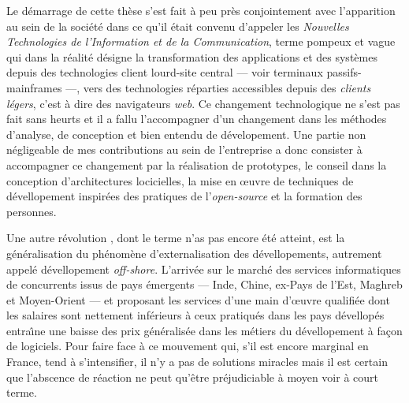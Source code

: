 Le d\'emarrage de cette th\`ese s'est fait \`a peu pr\`es
conjointement avec l'apparition  au sein de la soci\'et\'e dans ce qu'il
\'etait convenu d'appeler les \emph{Nouvelles Technologies de l'Information
et de la Communication}, terme pompeux et vague qui dans la
r\'ealit\'e d\'esigne la transformation des applications et des
syst\`emes depuis des technologies client lourd-site central --- voir
terminaux passifs-mainframes ---, vers des technologies r\'eparties
accessibles depuis des \emph{clients l\'egers}, c'est \`a dire des
navigateurs \emph{web}. Ce changement technologique ne s'est pas fait
sans heurts et il a fallu l'accompagner d'un changement dans les
m\'ethodes d'analyse, de conception et bien entendu de
d\'evelopement. Une partie non n\'egligeable de mes contributions au
sein de l'entreprise a donc consister \`a accompagner ce changement
par la r\'ealisation de prototypes, le conseil dans la conception
d'architectures locicielles, la mise en \oe uvre de techniques de
d\'evellopement inspir\'ees des pratiques de l'\emph{open-source} et
la formation des personnes.

Une autre \og r\'evolution \fg, dont le terme n'as pas encore
\'et\'e atteint, est la g\'en\'eralisation du ph\'enom\`ene
d'externalisation des d\'evellopements, autrement appel\'e
d\'evellopement \emph{off-shore}. L'arriv\'ee sur le march\'e des
services informatiques de concurrents issus de pays \'emergents
--- Inde, Chine, ex-Pays de l'Est, Maghreb et Moyen-Orient --- et
proposant les services d'une main d'\oe uvre qualifi\'ee dont les
salaires sont nettement inf\'erieurs \`a ceux pratiqu\'es dans les
pays d\'evellop\'es entra\^{\i}ne une baisse des prix
g\'en\'eralis\'ee dans les m\'etiers du d\'evellopement \`a
fa\c{c}on de logiciels. Pour faire face \`a ce mouvement qui, s'il
est encore marginal en France, tend \`a s'intensifier, il n'y a pas
de solutions miracles mais il est certain que l'abscence de
r\'eaction ne peut qu'\^etre pr\'ejudiciable \`a moyen voir \`a
court terme. 

